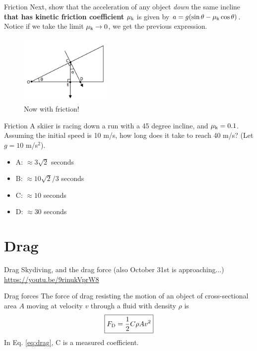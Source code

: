 \documentclass{beamer}
\begin{document}
\begin{frame}{Friction}
Next, show that the acceleration of any object \textit{down} the same incline \textbf{that has kinetic friction coefficient} $\mu_{\rm k} $ is given by $a = g(\sin\theta-\mu_{\rm k}\cos\theta)$.  Notice if we take the limit $\mu_{\rm k} \to 0$, we get the previous expression.
\begin{figure}
\centering
\includegraphics[width=0.4\textwidth]{figures/incline.png}
\caption{\label{fig:incline2} Now with friction!}
\end{figure}
\end{frame}

\begin{frame}{Friction}
A skiier is racing down a run with a 45 degree incline, and $\mu_{\rm k} = 0.1$.  Assuming the initial speed is 10 m/s, how long does it take to reach 40 m/s? (Let $g = 10$ m/s$^2$).
\begin{itemize}
\item A: $\approx 3\sqrt{2}$ seconds
\item B: $\approx 10\sqrt{2}/3$ seconds
\item C: $\approx 10$ seconds
\item D: $\approx 30$ seconds
\end{itemize}
\end{frame}

\section{Drag}

\begin{frame}{Drag}
Skydiving, and the drag force (also October 31st is approaching...)
\url{https://youtu.be/9rinukVprW8}
\end{frame}

\begin{frame}{Drag forces}
\alert{The force of drag} resisting the motion of an object of cross-sectional area $A$ moving at velocity $v$ through a fluid with density $\rho$ is \\
\begin{equation}
\boxed{F_{\rm D} = \frac{1}{2}C\rho A v^2}
\label{eq:drag}
\end{equation}
In Eq. \ref{eq:drag}, C is a measured coefficient.
\end{frame}
\end{document}
